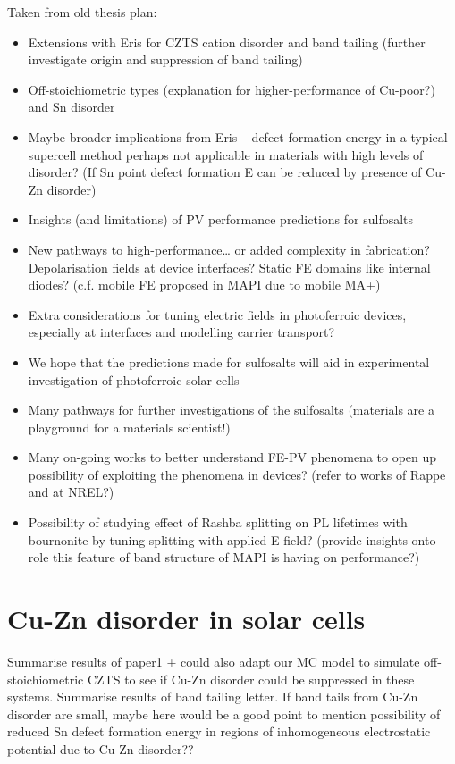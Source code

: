 \documentclass[11pt, twoside]{report}
\begin{document}
Taken from old thesis plan:
\begin{itemize}
\item Extensions with Eris for CZTS cation disorder and band tailing (further investigate origin and suppression of band tailing)
\item Off-stoichiometric types (explanation for higher-performance of Cu-poor?) and Sn disorder
\item Maybe broader implications from Eris – defect formation energy in a typical supercell method perhaps not applicable in materials with high levels of disorder? (If Sn point defect formation E can be reduced by presence of Cu-Zn disorder)
\item Insights (and limitations) of PV performance predictions for sulfosalts
\item New pathways to high-performance… or added complexity in fabrication? Depolarisation fields at device interfaces? Static FE domains like internal diodes? (c.f. mobile FE proposed in MAPI due to mobile MA+)
\item Extra considerations for tuning electric fields in photoferroic devices, especially at interfaces and modelling carrier transport?
\item We hope that the predictions made for sulfosalts will aid in experimental investigation of photoferroic solar cells
\item Many pathways for further investigations of the sulfosalts (materials are a playground for a materials scientist!)
\item Many on-going works to better understand FE-PV phenomena to open up possibility of exploiting the phenomena in devices? (refer to works of Rappe and at NREL?)
\item Possibility of studying effect of Rashba splitting on PL lifetimes with bournonite by tuning splitting with applied E-field? (provide insights onto role this feature of band structure of MAPI is having on performance?)
\end{itemize}

\section{Cu-Zn disorder in {\CZTS} solar cells}
Summarise results of paper1 + could also adapt our MC model to simulate off-stoichiometric CZTS to see if Cu-Zn disorder could be suppressed in these systems. Summarise results of band tailing letter. If band tails from Cu-Zn disorder are small, maybe here would be a good point to mention possibility of reduced Sn defect formation energy in regions of inhomogeneous electrostatic potential due to Cu-Zn disorder??
\end{document}
